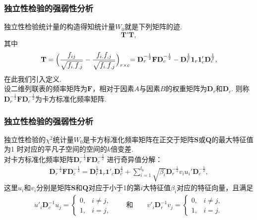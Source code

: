 \begin{frame}\frametitle{\color{blue}独立性检验的强弱性分析}
\quad\quad {\color{magenta} {\hei 2.独立性强弱分析及统计模拟}}
 \vskip0.3cm
\begin{footnotesize}
独立性检验统计量的构造得知统计量$W_{0}$就是下列矩阵的迹.
$$\mathbf{T}'\mathbf{T},$$
其中
\begin{eqnarray}
  \mathbf{T}=\Bigl(\frac{f_{ij}}{\sqrt{f_{i.}f_{.j}}}-\frac{f_{i.}f_{.j}}{\sqrt{f_{i.}f_{.j}}}\Bigl)_{r\times c}
  =\mathbf{D}^{-\frac{1}{2}}_{r}\mathbf{F}\mathbf{D}^{-\frac{1}{2}}_{c}-
    \mathbf{D}^{\frac{1}{2}}_{r}\mathbf{1}_{r}\mathbf{1}'_{c}\mathbf{D}^{\frac{1}{2}}_{c},
\end{eqnarray}
在此我们引入定义.\\
 \quad{}
      设二维列联表的频率矩阵为$\mathbf{F}$，相对于因素$A$与因素$B$的权重矩阵为$\mathbf{D}_{r}$和$\mathbf{D}_{c}$.
      则称$\mathbf{D}^{-\frac{1}{2}}_{r}\mathbf{F}\mathbf{D}^{-\frac{1}{2}}_{c}$为卡方标准化频率矩阵.

\end{footnotesize}

\end{frame}
\begin{frame}\frametitle{\color{blue}独立性检验的强弱性分析}

 \begin{footnotesize}
 \quad{}
 独立性检验的$\chi^{2}$统计量$W_{0}$是卡方标准化频率矩阵在正交于矩阵$\mathbf{S}$或$\mathbf{Q}$的最大特征值为1
时对应的平凡子空间的空间的$k$倍变差.\\
{}\quad 对卡方标准化频率矩阵$\mathbf{D}^{-\frac{1}{2}}_{r}\mathbf{F}\mathbf{D}^{-\frac{1}{2}}_{c}$
进行奇异值分解：
\begin{eqnarray}
     \mathbf{D}^{-\frac{1}{2}}_{r}\mathbf{F}\mathbf{D}^{-\frac{1}{2}}_{c}=
     \mathbf{D}^{\frac{1}{2}}_{r}\mathbf{1}_{r}\mathbf{1}'_{c}\mathbf{D}^{\frac{1}{2}}_{c}+
     \sum^{l_{0}}_{i=1}\sqrt{\beta_{i}}\mathbf{D}^{-\frac{1}{2}}_{r}v_{i}u_{i}'\mathbf{D}^{-\frac{1}{2}}_{c},
\end{eqnarray}
这里$u_{i}$和$v_{i}$分别是矩阵$\mathbf{S}$和$\mathbf{Q}$对应于小于1的第$i$大特征值$\beta_{i}$对应的特征向量，且满足
\begin{eqnarray}
u'_{i}\mathbf{D}^{-1}_{c}u_{j}=
\begin{cases}0,&i\neq j,\\1,& i=j,
\end{cases}
\quad\quad \text{和}\quad\quad v'_{i}\mathbf{D}^{-1}_{r}v_{j}=
\begin{cases}0,&i\neq j,\\1,& i=j.
\end{cases}
\end{eqnarray}
\end{footnotesize}
\end{frame}
